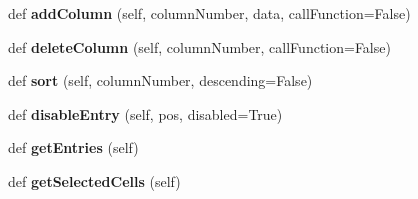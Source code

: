 \begin{DoxyCompactItemize}
def {\bfseries add\+Column} (self, column\+Number, data, call\+Function=False)
\item 
\mbox{\label{class_python_01_g_u_i_1_1appjar_1_1_simple_table_a255810d13014d601f0752d9ad1d9a961}} 
def {\bfseries delete\+Column} (self, column\+Number, call\+Function=False)
\item 
\mbox{\label{class_python_01_g_u_i_1_1appjar_1_1_simple_table_ab709bba5dfdd52ee5d75e32f3f8b0398}} 
def {\bfseries sort} (self, column\+Number, descending=False)
\item 
\mbox{\label{class_python_01_g_u_i_1_1appjar_1_1_simple_table_a8306973a46bcf914110854294bc6d165}} 
def {\bfseries disable\+Entry} (self, pos, disabled=True)
\item 
\mbox{\label{class_python_01_g_u_i_1_1appjar_1_1_simple_table_ae33cd748a2fc8a941ff59f31bd1578d1}} 
def {\bfseries get\+Entries} (self)
\item 
\mbox{\label{class_python_01_g_u_i_1_1appjar_1_1_simple_table_a37b0d1bf1790ef62262a5cfb2de6ffb0}} 
def {\bfseries get\+Selected\+Cells} (self)
\end{DoxyCompactItemize}
